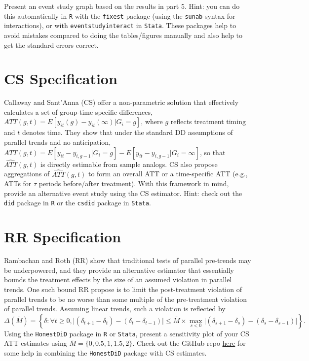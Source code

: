 \documentclass[
  12pt,
]{article}
\begin{document}
Present an event study graph based on the results in part 5. Hint: you
can do this automatically in \texttt{R} with the \texttt{fixest} package
(using the \texttt{sunab} syntax for interactions), or with
\texttt{eventstudyinteract} in \texttt{Stata}. These packages help to
avoid mistakes compared to doing the tables/figures manually and also
help to get the standard errors correct.

\newpage

\hypertarget{cs-specification}{%
\section{CS Specification}\label{cs-specification}}

Callaway and Sant'Anna (CS) offer a non-parametric solution that
effectively calculates a set of group-time specific differences,
\(ATT(g,t)= E[y_{it}(g) - y_{it}(\infty) | G_{i}=g]\), where \(g\)
reflects treatment timing and \(t\) denotes time. They show that under
the standard DD assumptions of parallel trends and no anticipation,
\(ATT(g,t) = E[y_{it} - y_{i, g-1} | G_{i}=g] - E[y_{it} - y_{i,g-1} | G_{i} = \infty]\),
so that \(\hat{ATT}(g,t)\) is directly estimable from sample analogs. CS
also propose aggregations of \(\hat{ATT}(g,t)\) to form an overall ATT
or a time-specific ATT (e.g., ATTs for \(\tau\) periods before/after
treatment). With this framework in mind, provide an alternative event
study using the CS estimator. Hint: check out the \texttt{did} package
in \texttt{R} or the \texttt{csdid} package in \texttt{Stata}.

\newpage

\hypertarget{rr-specification}{%
\section{RR Specification}\label{rr-specification}}

Rambachan and Roth (RR) show that traditional tests of parallel
pre-trends may be underpowered, and they provide an alternative
estimator that essentially bounds the treatment effects by the size of
an assumed violation in parallel trends. One such bound RR propose is to
limit the post-treatment violation of parallel trends to be no worse
than some multiple of the pre-treatment violation of parallel trends.
Assuming linear trends, such a violation is reflected by
\[\Delta(\bar{M}) = \left\{ \delta : \forall t \geq 0, \lvert (\delta_{t+1} - \delta_{t}) - (\delta_{t} - \delta_{t-1}) \rvert \leq \bar{M} \times \max_{s<0} \lvert (\delta_{s+1} - \delta_{s}) - (\delta_{s} - \delta_{s-1}) \rvert \right\}.\]
Using the \texttt{HonestDiD} package in \texttt{R} or \texttt{Stata},
present a sensitivity plot of your CS ATT estimates using
\(\bar{M} = \{0, 0.5, 1, 1.5, 2\}\). Check out the GitHub repo
\href{https://github.com/pedrohcgs/CS_RR}{here} for some help in
combining the \texttt{HonestDiD} package with CS estimates.
\end{document}
